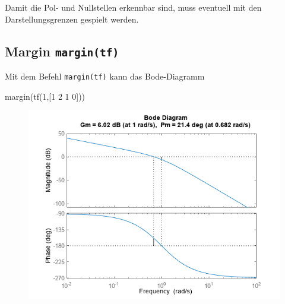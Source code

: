 \documentclass[
  10pt,
  a4paper,
]{article}
\newenvironment{Shaded}{}{}
\newcommand{\DecValTok}[1]{\textcolor[rgb]{0.00,0.36,0.77}{#1}}
\newcommand{\NormalTok}[1]{\textcolor[rgb]{0.14,0.16,0.18}{#1}}
\newcommand{\OtherTok}[1]{\textcolor[rgb]{0.44,0.26,0.76}{#1}}
\numberwithin{equation}{section}
\begin{document}
\begin{multicols}{2}
\begin{figure}[H]
{}

\end{figure}

\begin{tcolorbox}[enhanced jigsaw, coltitle=black, arc=.35mm, breakable, opacityback=0, opacitybacktitle=0.6, rightrule=.15mm, titlerule=0mm, bottomrule=.15mm, leftrule=.75mm, bottomtitle=1mm, colframe=quarto-callout-caution-color-frame, toprule=.15mm, colbacktitle=quarto-callout-caution-color!10!white, toptitle=1mm, title=\textcolor{quarto-callout-caution-color}{\faFire}\hspace{0.5em}{MATLAB Zauber}, left=2mm, colback=white]

Damit die Pol- und Nullstellen erkennbar sind, muss eventuell mit den
Darstellungsgrenzen gespielt werden.

\end{tcolorbox}

\hypertarget{margin-margintf}{%
\subsection{\texorpdfstring{Margin
\texttt{margin(tf)}}{Margin margin(tf)}}\label{margin-margintf}}

Mit dem Befehl \texttt{margin(tf)} kann das Bode-Diagramm

\begin{Shaded}
\begin{Highlighting}[]
\NormalTok{margin(tf(}\DecValTok{1}\OtherTok{,[}\DecValTok{1} \DecValTok{2} \DecValTok{1} \DecValTok{0}\OtherTok{]}\NormalTok{))}
\end{Highlighting}
\end{Shaded}

\begin{figure}[H]

{\centering \includegraphics{images/PlotGainAndPhaseMarginsOfTransferFunctionExample_01.png}

}
\end{figure}
\end{multicols}
\end{document}
